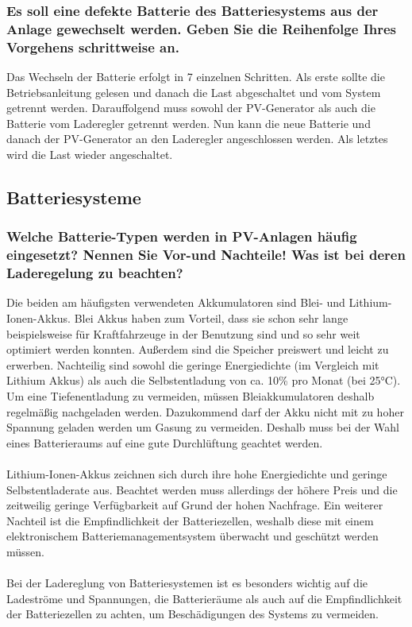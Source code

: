 \subsubsection{Es soll eine defekte Batterie des Batteriesystems aus der Anlage gewechselt werden. Geben Sie die Reihenfolge Ihres Vorgehens schrittweise an.}
Das Wechseln der Batterie erfolgt in 7 einzelnen Schritten. Als erste sollte die Betriebsanleitung gelesen und danach die Last abgeschaltet und vom System getrennt werden. Darauffolgend muss sowohl der PV-Generator als auch die Batterie vom Laderegler getrennt werden. Nun kann die neue Batterie und danach der PV-Generator an den Laderegler angeschlossen werden. Als letztes wird die Last wieder angeschaltet.

\subsection{Batteriesysteme}
\subsubsection{Welche Batterie-Typen werden in PV-Anlagen häufig eingesetzt? Nennen Sie Vor-und Nachteile! Was ist bei deren Laderegelung zu beachten?}
Die beiden am häufigsten verwendeten Akkumulatoren sind Blei- und Lithium-Ionen-Akkus.
Blei Akkus haben zum Vorteil, dass sie schon sehr lange beispielsweise für Kraftfahrzeuge in der Benutzung sind und so sehr weit optimiert werden konnten. Außerdem sind die Speicher preiswert und leicht zu erwerben. Nachteilig sind sowohl die geringe Energiedichte (im Vergleich mit Lithium Akkus) als auch die Selbstentladung von ca. 10\% pro Monat (bei 25°C). Um eine Tiefenentladung zu vermeiden, müssen Bleiakkumulatoren deshalb regelmäßig nachgeladen werden. Dazukommend darf der Akku nicht mit zu hoher Spannung geladen werden um Gasung zu vermeiden. Deshalb muss bei der Wahl eines Batterieraums auf eine gute Durchlüftung geachtet werden.\\\\
Lithium-Ionen-Akkus zeichnen sich durch ihre hohe Energiedichte und geringe Selbstentladerate aus. Beachtet werden muss allerdings der höhere Preis und die zeitweilig geringe Verfügbarkeit auf Grund der hohen Nachfrage. Ein weiterer Nachteil ist die Empfindlichkeit der Batteriezellen, weshalb diese mit einem elektronischem Batteriemanagementsystem überwacht und geschützt werden müssen.\\\\
Bei der Ladereglung von Batteriesystemen ist es besonders wichtig auf die Ladeströme und Spannungen, die Batterieräume als auch auf die Empfindlichkeit der Batteriezellen zu achten, um Beschädigungen des Systems zu vermeiden.

